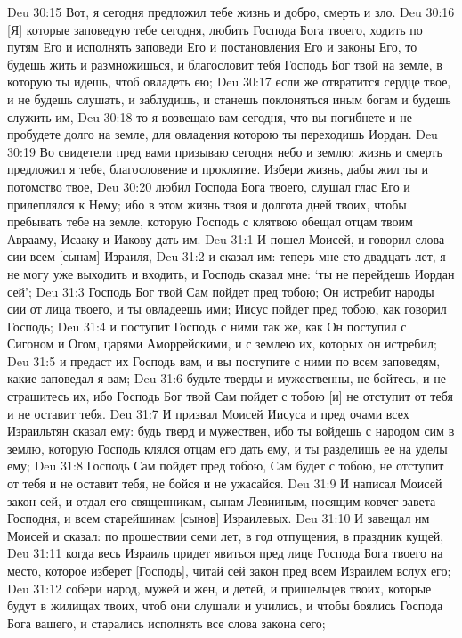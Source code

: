Deu 30:15  Вот, я сегодня предложил тебе жизнь и добро, смерть и зло.
Deu 30:16  [Я] которые заповедую тебе сегодня, любить Господа Бога твоего, ходить по путям Его и исполнять заповеди Его и постановления Его и законы Его, то будешь жить и размножишься, и благословит тебя Господь Бог твой на земле, в которую ты идешь, чтоб овладеть ею;
Deu 30:17  если же отвратится сердце твое, и не будешь слушать, и заблудишь, и станешь поклоняться иным богам и будешь служить им,
Deu 30:18  то я возвещаю вам сегодня, что вы погибнете и не пробудете долго на земле, для овладения которою ты переходишь Иордан.
Deu 30:19  Во свидетели пред вами призываю сегодня небо и землю: жизнь и смерть предложил я тебе, благословение и проклятие. Избери жизнь, дабы жил ты и потомство твое,
Deu 30:20  любил Господа Бога твоего, слушал глас Его и прилеплялся к Нему; ибо в этом жизнь твоя и долгота дней твоих, чтобы пребывать тебе на земле, которую Господь с клятвою обещал отцам твоим Аврааму, Исааку и Иакову дать им.
Deu 31:1  И пошел Моисей, и говорил слова сии всем [сынам] Израиля,
Deu 31:2  и сказал им: теперь мне сто двадцать лет, я не могу уже выходить и входить, и Господь сказал мне: `ты не перейдешь Иордан сей';
Deu 31:3  Господь Бог твой Сам пойдет пред тобою; Он истребит народы сии от лица твоего, и ты овладеешь ими; Иисус пойдет пред тобою, как говорил Господь;
Deu 31:4  и поступит Господь с ними так же, как Он поступил с Сигоном и Огом, царями Аморрейскими, и с землею их, которых он истребил;
Deu 31:5  и предаст их Господь вам, и вы поступите с ними по всем заповедям, какие заповедал я вам;
Deu 31:6  будьте тверды и мужественны, не бойтесь, и не страшитесь их, ибо Господь Бог твой Сам пойдет с тобою [и] не отступит от тебя и не оставит тебя.
Deu 31:7  И призвал Моисей Иисуса и пред очами всех Израильтян сказал ему: будь тверд и мужествен, ибо ты войдешь с народом сим в землю, которую Господь клялся отцам его дать ему, и ты разделишь ее на уделы ему;
Deu 31:8  Господь Сам пойдет пред тобою, Сам будет с тобою, не отступит от тебя и не оставит тебя, не бойся и не ужасайся.
Deu 31:9  И написал Моисей закон сей, и отдал его священникам, сынам Левииным, носящим ковчег завета Господня, и всем старейшинам [сынов] Израилевых.
Deu 31:10  И завещал им Моисей и сказал: по прошествии семи лет, в год отпущения, в праздник кущей,
Deu 31:11  когда весь Израиль придет явиться пред лице Господа Бога твоего на место, которое изберет [Господь], читай сей закон пред всем Израилем вслух его;
Deu 31:12  собери народ, мужей и жен, и детей, и пришельцев твоих, которые будут в жилищах твоих, чтоб они слушали и учились, и чтобы боялись Господа Бога вашего, и старались исполнять все слова закона сего;
